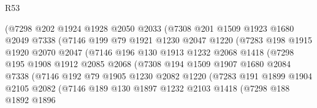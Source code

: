 \begin{lexlean}{R53}
\begin{coremodule}
                    (@7298
                      @202
                      @1924
                      @1928
                      @2050
                      @2033
                      (@7308
                        @201
                        @1509
                        @1923
                        @1680
                        @2049
                        @7338
                        (@7146
                          @199
                          @79
                          @1921
                          @1230
                          @2047
                          @1220
                          (@7283
                            @198
                            @1915
                            @1920
                            @2070
                            @2047
                            (@7146
                              @196
                              @130
                              @1913
                              @1232
                              @2068
                              @1418
                              (@7298
                                @195
                                @1908
                                @1912
                                @2085
                                @2068
                                (@7308
                                  @194
                                  @1509
                                  @1907
                                  @1680
                                  @2084
                                  @7338
                                  (@7146
                                    @192
                                    @79
                                    @1905
                                    @1230
                                    @2082
                                    @1220
                                    (@7283
                                      @191
                                      @1899
                                      @1904
                                      @2105
                                      @2082
                                      (@7146
                                        @189
                                        @130
                                        @1897
                                        @1232
                                        @2103
                                        @1418
                                        (@7298
                                          @188
                                          @1892
                                          @1896

\end{coremodule}
\end{lexlean}
